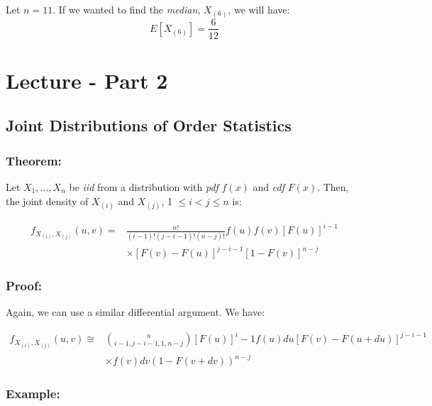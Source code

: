 \documentclass{article}
\begin{document}
\noindent Let $n = 11$. If we wanted to find the \textit{median}, $X_{(6)}$, we will have:
\begin{equation*}
    E\left[X_{(6)} \right] = \frac{6}{12}
\end{equation*}

\section{Lecture - Part 2}

\subsection{Joint Distributions of Order Statistics}

\subsubsection*{Theorem:}

Let $X_1,...,X_n$ be \textit{iid} from a distribution with \textit{pdf} $f(x)$ and \textit{cdf} $F(x)$. Then, the joint density of $X_{(i)}$ and $X_{(j)}$, 1 $\leq i < j \leq n$ is:

\begin{equation*}
\begin{split}
    f_{X_{(i)},X_{(j)}} (u,v) = &\frac{n!}{(i-1)!(j-i-1)!(n-j)!} f(u) f(v) \left[F(u) \right]^{i-1}\\
    &\times \left[F(v)-F(u) \right]^{j-i-1} \left[1-F(v) \right]^{n-j}
\end{split}
\end{equation*}

\subsubsection*{Proof:}

Again, we can use a similar differential argument. We have:

\begin{equation*}
    \begin{split}
        f_{X_{(i)},X_{(j)}} (u,v) \cong &\binom{n}{i-1,j-i-1,1,n-j} \left[F(u) \right]^i-1 f(u) du \left[F(v) - F(u+du) \right]^{j-i-1}\\
        &\times f(v) dv \left(1-F(v+dv) \right)^{n-j}
    \end{split}
\end{equation*}

\subsubsection*{Example:}
\end{document}

